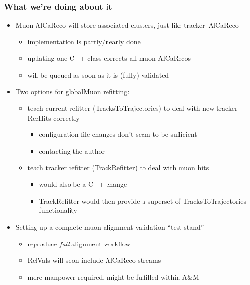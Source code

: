 \documentclass[compress]{beamer}
\begin{document}
\begin{frame}
\frametitle{What we're doing about it}
\small

\begin{itemize}
\item Muon AlCaReco will store associated clusters, just like \mbox{tracker AlCaReco\hspace{-1 cm}}
\begin{itemize}
\item implementation is partly/nearly done
\item updating one C++ class corrects all muon AlCaRecos
\item will be queued as soon as it is (fully) validated
\end{itemize}

\item Two options for globalMuon refitting:
\begin{itemize}
\item teach current refitter (TracksToTrajectories) to deal with new tracker RecHits correctly
\begin{itemize}
\item configuration file changes don't seem to be sufficient
\item contacting the author
\end{itemize}

\item teach tracker refitter (TrackRefitter) to deal with muon hits
\begin{itemize}
\item would also be a C++ change
\item TrackRefitter would then provide a superset of TracksToTrajectories functionality
\end{itemize}

\end{itemize}

\item Setting up a complete muon alignment validation ``test-stand''
\begin{itemize}
\item reproduce {\it full} alignment workflow
\item RelVals will soon include AlCaReco streams
\item more manpower required, might be fulfilled within A\&M
\end{itemize}
\end{itemize}
\end{frame}

\end{document}
